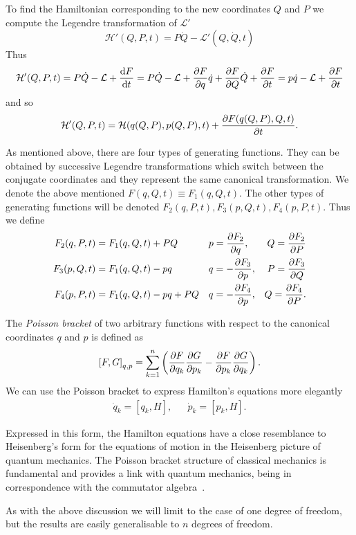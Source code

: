 \documentclass[../thesis.tex]{subfiles}
\theoremstyle{plain}
\begin{document}
To find the Hamiltonian corresponding to the new coordinates $Q$ and $P$ we
compute the Legendre transformation of \(\mathcal{L'}\)
\[
  \mathcal{H'}(Q, P, t) = P\dot{Q} - \mathcal{L'}(Q, \dot{Q}, t)
\]
Thus
\[
  \mathcal{H'}(Q, P, t) = P\dot{Q} - \mathcal{L} + \dv{F}{t} =
  P\dot{Q} - \mathcal{L} + \pdv{F}{q} \dot{q} + \pdv{F}{Q} \dot{Q} + \pdv{F}{t} =
  p\dot{q} - \mathcal{L} + \pdv{F}{t}
\]
and so
\begin{equation}
  \label{eq:canonical-transf}
  \mathcal{H'}(Q, P, t) = \mathcal{H}(q(Q,P), p(Q, P), t) + \pdv{F(q(Q,P), Q, t)}{t}.
\end{equation}

As mentioned above, there are four types of generating functions. They can be obtained
by successive Legendre transformations which switch between the conjugate coordinates and
they represent the same canonical transformation. We denote the above mentioned
\(F(q, Q, t) \equiv F_1(q, Q, t)\). The other types of generating functions will be denoted
\(F_2(q, P, t), F_3(p, Q, t), F_4(p, P, t)\). Thus we define
\begin{align*}
  F_2(q, P, t) &= F_1(q, Q, t) + PQ &&
  p = \pdv{F_2}{q}, & Q = \pdv{F_2}{P} \\
  F_3(p, Q, t) &= F_1(q, Q, t) - pq &&
  q = - \pdv{F_3}{p}, & P = \pdv{F_3}{Q} \\
  F_4(p, P, t) &= F_1(q, Q, t) - pq + PQ &&
  q = - \pdv{F_4}{p}, & Q = \pdv{F_4}{P}.
\end{align*}

The \emph{Poisson bracket} of two arbitrary functions with respect to the canonical coordinates
$q$ and $p$ is defined as
\[
  {\left[F, G\right]}_{q,p} = \sum_{k=1}^n \left( \pdv{F}{q_k} \pdv{G}{p_k} -
                                                  \pdv{F}{p_k} \pdv{G}{q_k} \right).
\]
We can use the Poisson bracket to express Hamilton's equations more elegantly
\begin{align*}
  \dot{q}_k = [q_k,H], && \dot{p}_k = [p_k,H].
\end{align*}

Expressed in this form, the Hamilton equations have a close resemblance to
Heisenberg's form for the equations of motion in the Heisenberg picture of
quantum mechanics. The Poisson bracket structure of classical mechanics is
fundamental and provides a link with quantum mechanics, being in correspondence
with the commutator algebra~\cite{Dirac1967}.

As with the above discussion we will limit to the case of one degree of freedom,
but the results are easily generalisable to $n$ degrees of freedom.
\end{document}
